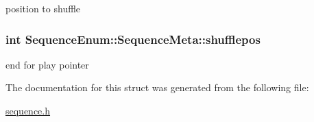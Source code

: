 position to shuffle 

\hypertarget{structSequenceEnum_1_1SequenceMeta_ac76334a90ea5cdcefa31a099a35fa4dc}{
\subsubsection[{shufflepos}]{\setlength{\rightskip}{0pt plus 5cm}int Sequence\-Enum\-::\-Sequence\-Meta\-::shufflepos}}\label{structSequenceEnum_1_1SequenceMeta_ac76334a90ea5cdcefa31a099a35fa4dc}


end for play pointer 



The documentation for this struct was generated from the following file\-:\begin{DoxyCompactItemize}
\item 
\hyperlink{sequence_8h}{sequence.\-h}\end{DoxyCompactItemize}
